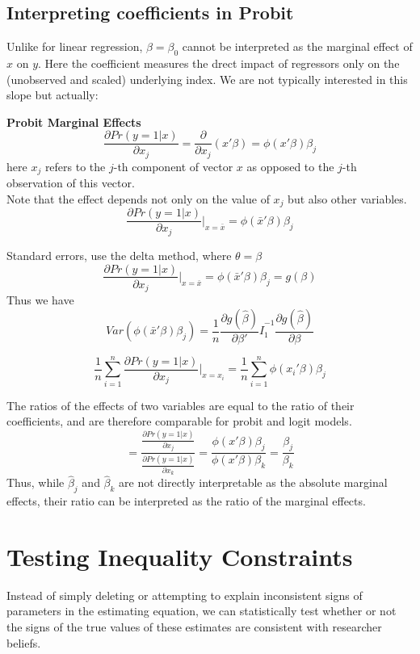 \documentclass[DIV=14,titlepage=false]{scrreprt}
\begin{document}
\subsection{Interpreting coefficients in Probit}
Unlike for linear regression, \(\beta=\beta_0\) cannot be interpreted as the marginal effect of \(x\) on \(y\). Here the coefficient measures the drect impact of regressors only on the (unobserved and scaled) underlying index. We are not typically interested in this slope but actually:
\begin{definition} \textbf{Probit Marginal Effects}
\[\frac{\partial Pr(y=1|x)}{\partial x_j}=\frac{\partial}{\partial x_j}(x'\beta)=\phi(x'\beta) \beta_j\]
here \(x_j\) refers to the \(j\)-th component of vector \(x\) as opposed to the \(j\)-th observation of this vector.
\\
Note that the effect depends not only on the value of \(x_j\) but also other variables.
\\
\underline{}
\[\frac{\partial Pr(y=1|x)}{\partial x_j}\big|_{x=\bar{x}}=\phi(\bar{x}'\beta)\beta_j\]

Standard errors, use the delta method, where \(\theta=\beta\)
\[\frac{\partial Pr(y=1|x)}{\partial x_j}\big|_{x=\bar{x}}=\phi(\bar{x}'\beta)\beta_j=g(\beta)\]
Thus we have
\[\hat{Var}(\phi(\bar{x}'\beta)\beta_j)=\frac{1}{n}\frac{\partial g(\hat{\beta})}{\partial \beta'}\hat{I}_1^{-1}\frac{\partial g(\hat{\beta})}{\partial \beta}\]

\underline{}
\[\frac{1}{n}\sum_{i=1}^n\frac{\partial Pr(y=1|x)}{\partial x_j}\big|_{x=x_i}=\frac{1}{n}\sum_{i=1}^n\phi(x_i'\beta)\beta_j\]
\end{definition}

\vspace{5mm}
\begin{note}
The ratios of the effects of two variables are equal to the ratio of their coefficients, and are therefore comparable for probit and logit models.
\[=\frac{\frac{\partial Pr(y=1|x)}{\partial x_j}}{\frac{\partial Pr(y=1|x)}{\partial x_k}}=\frac{\phi(x'\beta)\beta_j}{\phi(x'\beta)\beta_k}=\frac{\beta_j}{\beta_k}\]
Thus, while \(\hat{\beta}_j\) and \(\hat{\beta}_k\) are not directly interpretable as the absolute marginal effects, their ratio can be interpreted as the ratio of the marginal effects.
\end{note}

\section{Testing Inequality Constraints}
Instead of simply deleting or attempting to explain inconsistent signs of parameters in the estimating equation, we can statistically test whether or not the signs of the true values of these estimates are consistent with researcher beliefs.
\end{document}
